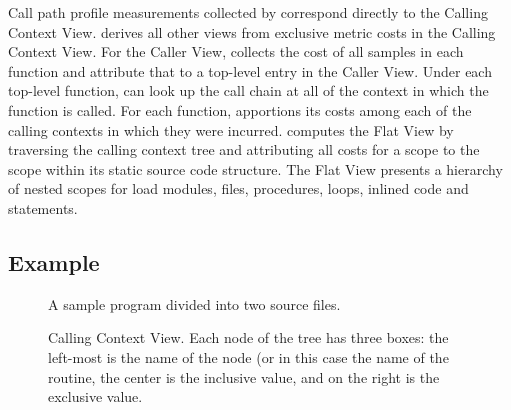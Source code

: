 Call path profile measurements collected by \hpcrun{} correspond directly to the Calling Context View.
\hpcviewer{} derives all other views from exclusive metric costs in the Calling Context View.
For the Caller View, \hpcviewer{} collects the cost of all samples in each function and attribute that to a top-level entry in the Caller View.
Under each top-level function, \hpcviewer{} can look up the call chain at all of the context in which the function is called.
For each function, \hpcviewer{} apportions its costs among each of the calling contexts in which they were incurred.
\hpcviewer{} computes the Flat View by traversing the calling context tree and attributing all costs for a scope to the scope within its static source code structure.
The Flat View presents a hierarchy of nested scopes for load modules, files, procedures, loops, inlined code and statements.



\subsection{Example}

\begin{figure}[t]
\caption{A sample program divided into two source files.}
\label{fig:source-files}
\end{figure}



\begin{figure}[t]
\caption{Calling Context View. Each node of the tree has three boxes: the left-most is the name of the node (or in this case the name of the routine, the center is the inclusive value, and on the right is the exclusive value.}
\label{fig:cct}
\end{figure}

